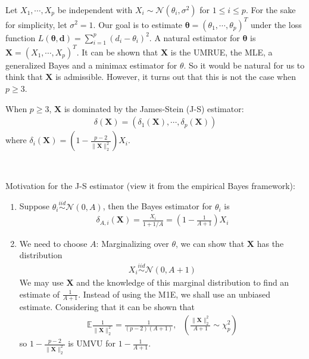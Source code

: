 \begin{example}
    Let $X_1,\cdots,X_p$ be independent with $X_i\sim\mathcal{N}(\theta_i,\sigma^2)$
    for $1\leq{i}\leq{p}$.
    For the sake for simplicity, let $\sigma^2=1$.
    Our goal is to estimate $\boldsymbol{\theta}=(\theta_1,\cdots,\theta_p)^T$
    under the loss function 
    $L(\boldsymbol{\theta},\boldsymbol{d})=\sum_{i=1}^p(d_i-\theta_i)^2$.
    A natural estimator for $\boldsymbol{\theta}$ is $\boldsymbol{X}=(X_1,\cdots,X_p)^T$.
    It can be shown that $\boldsymbol{X}$ is the UMRUE,
    the MLE, a generalized Bayes and a minimax estimator for $\theta$.
    So it would be natural for us to think that $\boldsymbol{X}$ is admissible.
    However, it turns out that this is not the case when $p\geq{3}$.

    When $p\geq 3$, $\boldsymbol{X}$ is dominated by the James-Stein (J-S) estimator:
    \begin{gather}
        \delta(\boldsymbol{X})=(\delta_1(\boldsymbol{X}),\cdots,\delta_p(\boldsymbol{X}))
    \end{gather}
    where $\delta_i(\boldsymbol{X})=\left(1-\frac{p-2}{\|\boldsymbol{X}\|_2^2}\right)X_i$.
\end{example}
$~$\newline

Motivation for the J-S estimator (view it from the empirical Bayes framework):
\begin{enumerate}
    \item Suppose $\theta_i\overset{iid}{\sim}\mathcal{N}(0,A)$,
    then the Bayes estimator for $\theta_i$ is 
    \begin{gather}
        \delta_{A,i}(\boldsymbol{X})=\frac{X_i}{1+1/A}=\left(1-\frac{1}{A+1}\right)X_i
    \end{gather}
    \item We need to choose $A$:
    Marginalizing over $\theta$, we can show that $\boldsymbol{X}$ has the distribution
    \begin{gather}
        X_i\overset{iid}{\sim}\mathcal{N}(0,A+1)
    \end{gather}
    We may use $\boldsymbol{X}$ and the knowledge of this marginal distribution to find an estimate of $\frac{1}{A+1}$.
    Instead of using the M1E, we shall use an unbiased estimate.
    Considering that it can be shown that 
    \begin{gather}
        \mathbb{E}\frac{1}{\|\boldsymbol{X}\|_2^2}=\frac{1}{(p-2)(A+1)},~~~\left(\frac{\|\boldsymbol{X}\|_2^2}{A+1}\sim\chi^2_p\right)
    \end{gather}
    so $1-\frac{p-2}{\|\boldsymbol{X}\|_2^2}$ is UMVU for $1-\frac{1}{A+1}$.
\end{enumerate}

